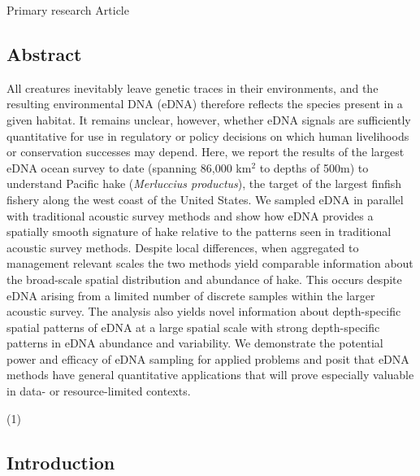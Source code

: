 \documentclass[
]{article}
\begin{document}
Primary research Article

\pagebreak

\hypertarget{abstract}{%
\subsection{Abstract}\label{abstract}}

All creatures inevitably leave genetic traces in their environments, and
the resulting environmental DNA (eDNA) therefore reflects the species
present in a given habitat. It remains unclear, however, whether eDNA
signals are sufficiently quantitative for use in regulatory or policy
decisions on which human livelihoods or conservation successes may
depend. Here, we report the results of the largest eDNA ocean survey to
date (spanning 86,000 km\(^2\) to depths of 500m) to understand Pacific
hake (\emph{Merluccius productus}), the target of the largest finfish
fishery along the west coast of the United States. We sampled eDNA in
parallel with traditional acoustic survey methods and show how eDNA
provides a spatially smooth signature of hake relative to the patterns
seen in traditional acoustic survey methods. Despite local differences,
when aggregated to management relevant scales the two methods yield
comparable information about the broad-scale spatial distribution and
abundance of hake. This occurs despite eDNA arising from a limited
number of discrete samples within the larger acoustic survey. The
analysis also yields novel information about depth-specific spatial
patterns of eDNA at a large spatial scale with strong depth-specific
patterns in eDNA abundance and variability. We demonstrate the potential
power and efficacy of eDNA sampling for applied problems and posit that
eDNA methods have general quantitative applications that will prove
especially valuable in data- or resource-limited contexts.

(1)

\pagebreak

\hypertarget{introduction}{%
\subsection{Introduction}\label{introduction}}
\end{document}
